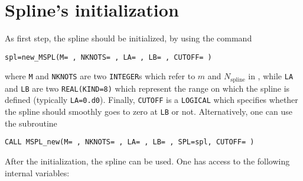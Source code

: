 \documentclass[11pt,a4paper,twoside]{article}
\begin{document}
\section{Spline's initialization}
As first step, the spline should be initialized, by using the command
\begin{verbatim}
spl=new_MSPL(M= , NKNOTS= , LA= , LB= , CUTOFF= )
\end{verbatim}
where \verb+M+ and \verb+NKNOTS+ are two \verb+INTEGER+s which refer to $m$ and $N_{\text{spline}}$ in \cite{Holzmann2005111}, while \verb+LA+ and \verb+LB+ are two \verb+REAL(KIND=8)+ which represent the range on which the spline is defined (typically \verb+LA=0.d0+). Finally, \verb+CUTOFF+ is a \verb+LOGICAL+ which specifies whether the spline should smoothly goes to zero at \verb+LB+ or not.
Alternatively, one can use the subroutine
\begin{verbatim}
CALL MSPL_new(M= , NKNOTS= , LA= , LB= , SPL=spl, CUTOFF= )
\end{verbatim}
After the initialization, the spline can be used.
One has access to the following internal variables:
\end{document}
